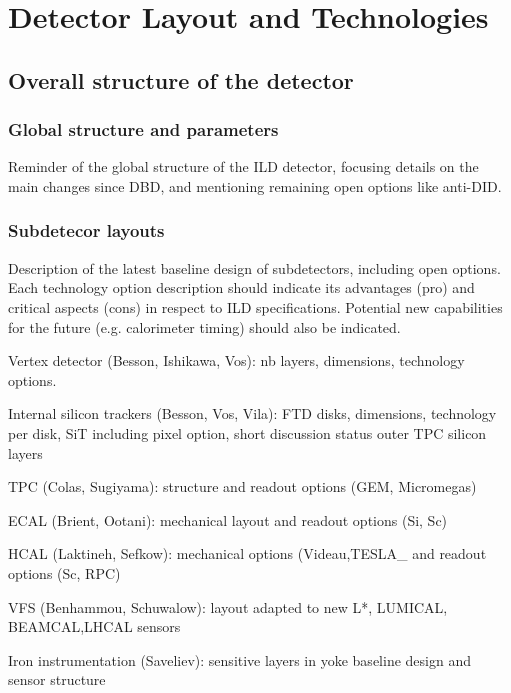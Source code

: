 \chapter{Detector Layout and Technologies}

\section{Overall structure of the detector}
\vspace{4cm}
\subsection{Global structure and parameters}

Reminder of the global structure of the ILD detector, focusing details on the main changes since DBD, and mentioning remaining open options like anti-DID.

\vspace{2cm}
\subsection{Subdetecor layouts}

Description of the latest baseline design of subdetectors, including open options. Each technology option description should indicate its advantages (pro) and critical aspects (cons) in respect to ILD specifications. Potential new capabilities for the future (e.g. calorimeter timing) should also be indicated.

Vertex detector (Besson, Ishikawa, Vos): nb layers, dimensions, technology options.

Internal silicon trackers (Besson, Vos, Vila): FTD disks, dimensions, technology per disk, SiT including pixel option, short discussion status
outer TPC  silicon layers

TPC (Colas, Sugiyama): structure and readout options (GEM, Micromegas)

ECAL (Brient, Ootani): mechanical layout and readout options (Si, Sc)

HCAL (Laktineh, Sefkow): mechanical options (Videau,TESLA_ and readout options (Sc, RPC)

VFS (Benhammou, Schuwalow): layout adapted to new L*, LUMICAL, BEAMCAL,LHCAL sensors

Iron instrumentation (Saveliev): sensitive layers in yoke baseline design and sensor structure

